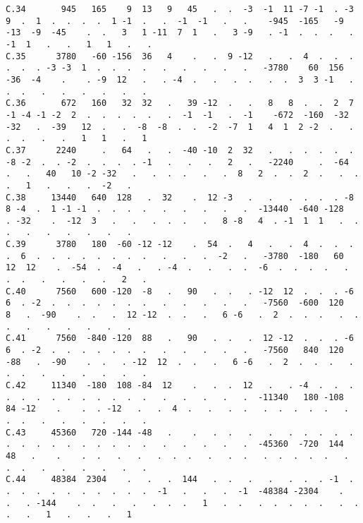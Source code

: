 \begin{verbatim}
C.34       945   165    9  13   9   45   .  .  -3  -1  11 -7 -1  . -3  9  .  1  .  .  .  .  1 -1  .   .  -1  -1   .   .    -945  -165   -9 -13  -9  -45    .  .   3   1 -11  7  1   .   3 -9   . -1  .  .  .   . -1  1   .   .   1   1   .   .
C.35      3780   -60 -156  36   4    .   .  9 -12   .   .  4  .  .  .  .  .  . -3 -3  1  .  .  .  .   .   .   .   .   .   -3780    60  156 -36  -4    .    . -9  12   .   . -4  .   .   .  .   .  .  3  3 -1   .  .  .   .   .   .   .   .   .
C.36       672   160   32  32   .   39 -12  .   .   8   8  .  .  2  7 -1 -4 -1 -2  2  .  .  .  .  .   .  -1  -1   .  -1    -672  -160  -32 -32   .  -39   12  .   .  -8  -8  .  .  -2  -7  1   4  1  2 -2  .   .  .  .   .   .   1   1   .   1
C.37      2240     .   64   .   .  -40 -10  2  32   .   .  .  .  .  . -8 -2  .  . -2  .  .  .  . -1   .   .   .   2   .   -2240     .  -64   .   .   40   10 -2 -32   .   .  .  .   .   .  8   2  .  .  2  .   .  .  .   1   .   .   .  -2   .
C.38     13440   640  128   .  32    .  12 -3   .   .   .  .  .  . -8  8 -4  .  1 -1 -1  .  .  .  .   .   .   .   .   .  -13440  -640 -128   . -32    .  -12  3   .   .   .  .  .   .   8 -8   4  . -1  1  1   .  .  .   .   .   .   .   .   .
C.39      3780   180  -60 -12 -12    .  54  .   4   .   .  4  .  .  .  .  6  .  .  .  .  .  .  .  .   .   .   .  -2   .   -3780  -180   60  12  12    .  -54  .  -4   .   . -4  .   .   .  .  -6  .  .  .  .   .  .  .   .   .   .   .   2   .
C.40      7560   600 -120  -8   .   90   .  .   . -12  12  .  .  . -6  6  . -2  .  .  .  .  .  .  .   .   .   .   .   .   -7560  -600  120   8   .  -90    .  .   .  12 -12  .  .   .   6 -6   .  2  .  .  .   .  .  .   .   .   .   .   .   .
C.41      7560  -840 -120  88   .   90   .  .   .  12 -12  .  .  . -6  6  . -2  .  .  .  .  .  .  .   .   .   .   .   .   -7560   840  120 -88   .  -90    .  .   . -12  12  .  .   .   6 -6   .  2  .  .  .   .  .  .   .   .   .   .   .   .
C.42     11340  -180  108 -84  12    .   .  .  12   .   . -4  .  .  .  .  .  .  .  .  .  .  .  .  .   .   .   .   .   .  -11340   180 -108  84 -12    .    .  . -12   .   .  4  .   .   .  .   .  .  .  .  .   .  .  .   .   .   .   .   .   .
C.43     45360   720 -144 -48   .    .   .  .   .   .   .  .  .  .  .  .  .  .  .  .  .  .  .  .  .   .   .   .   .   .  -45360  -720  144  48   .    .    .  .   .   .   .  .  .   .   .  .   .  .  .  .  .   .  .  .   .   .   .   .   .   .
C.44     48384  2304    .   .   .  144   .  .   .   .   .  .  . -1  .  .  .  .  .  .  .  .  .  .  .  -1   .   .   .  -1  -48384 -2304    .   .   . -144    .  .   .   .   .  .  .   1   .  .   .  .  .  .  .   .  .  .   .   1   .   .   .   1

\end{verbatim}
